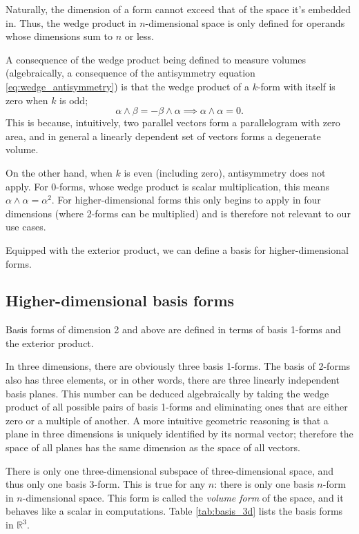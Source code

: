 \documentclass[utf8,english]{gradu3}
\begin{document}
Naturally, the dimension of a form cannot exceed that of the space it's embedded in.
Thus, the wedge product in $n$-dimensional space
is only defined for operands whose dimensions sum to $n$ or less.

A consequence of the wedge product being defined to measure volumes
(algebraically, a consequence of the antisymmetry equation \eqref{eq:wedge_antisymmetry})
is that the wedge product of a $k$-form with itself is zero when $k$ is odd;
\[
  \alpha \wedge \beta = -\beta \wedge \alpha
  \implies \alpha \wedge \alpha = 0.
\]
This is because, intuitively, two parallel vectors
form a parallelogram with zero area,
and in general a linearly dependent set of vectors
forms a degenerate volume.

On the other hand, when $k$ is even (including zero), antisymmetry does not apply.
For 0-forms, whose wedge product is scalar multiplication,
this means $\alpha \wedge \alpha = \alpha^2$.
For higher-dimensional forms this only begins to apply in four dimensions
(where 2-forms can be multiplied) and is therefore not relevant to our use cases.

Equipped with the exterior product,
we can define a basis for higher-dimensional forms.


\subsection{Higher-dimensional basis forms}\label{sec:basis_higher}

Basis forms of dimension 2 and above
are defined in terms of basis 1-forms and the exterior product.

In three dimensions, there are obviously three basis 1-forms.
The basis of 2-forms also has three elements,
or in other words, there are three linearly independent basis planes.
This number can be deduced algebraically
by taking the wedge product of all possible pairs of basis 1-forms
and eliminating ones that are either zero or a multiple of another.
A more intuitive geometric reasoning is that 
a plane in three dimensions is uniquely identified by its normal vector;
therefore the space of all planes has the same dimension as the space of all vectors.

There is only one three-dimensional subspace of three-dimensional space,
and thus only one basis 3-form.
This is true for any $n$:
there is only one basis $n$-form in $n$-dimensional space.
This form is called the \textit{volume form} of the space,
and it behaves like a scalar in computations.
Table \ref{tab:basis_3d} lists the basis forms in $\mathbb{R}^3$.
\end{document}
